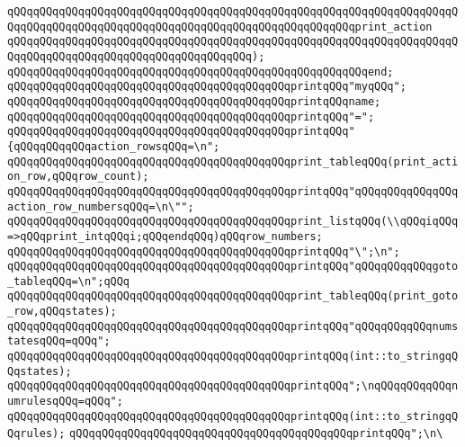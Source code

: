\verb|qQQqqQQqqQQqqQQqqQQqqQQqqQQqqQQqqQQqqQQqqQQqqQQqqQQqqQQqqQQqqQQqqQQqqQQqqQQqqQQqqQQqqQQqqQQqqQQqqQQqqQQqqQQqqQQqqQQqqQQqqQQqprint_action|\newline
\verb|qQQqqQQqqQQqqQQqqQQqqQQqqQQqqQQqqQQqqQQqqQQqqQQqqQQqqQQqqQQqqQQqqQQqqQQqqQQqqQQqqQQqqQQqqQQqqQQqqQQqqQQqqQQq);|\newline
\verb|qQQqqQQqqQQqqQQqqQQqqQQqqQQqqQQqqQQqqQQqqQQqqQQqqQQqqQQqend;|\newline
\newline
\verb|qQQqqQQqqQQqqQQqqQQqqQQqqQQqqQQqqQQqqQQqqQQqprintqQQq"myqQQq";|\newline
\verb|qQQqqQQqqQQqqQQqqQQqqQQqqQQqqQQqqQQqqQQqqQQqprintqQQqname;|\newline
\verb|qQQqqQQqqQQqqQQqqQQqqQQqqQQqqQQqqQQqqQQqqQQqprintqQQq"=";|\newline
\verb|qQQqqQQqqQQqqQQqqQQqqQQqqQQqqQQqqQQqqQQqqQQqprintqQQq"{qQQqqQQqqQQqaction_rowsqQQq=\n";|\newline
\verb|qQQqqQQqqQQqqQQqqQQqqQQqqQQqqQQqqQQqqQQqqQQqprint_tableqQQq(print_action_row,qQQqrow_count);|\newline
\verb|qQQqqQQqqQQqqQQqqQQqqQQqqQQqqQQqqQQqqQQqqQQqprintqQQq"qQQqqQQqqQQqqQQqaction_row_numbersqQQq=\n\"";|\newline
\verb|qQQqqQQqqQQqqQQqqQQqqQQqqQQqqQQqqQQqqQQqqQQqprint_listqQQq(\\qQQqiqQQq=>qQQqprint_intqQQqi;qQQqendqQQq)qQQqrow_numbers;|\newline
\verb|qQQqqQQqqQQqqQQqqQQqqQQqqQQqqQQqqQQqqQQqqQQqprintqQQq"\";\n";|\newline
\verb|qQQqqQQqqQQqqQQqqQQqqQQqqQQqqQQqqQQqqQQqqQQqprintqQQq"qQQqqQQqqQQqgoto_tableqQQq=\n";qQQq|\newline
\verb|qQQqqQQqqQQqqQQqqQQqqQQqqQQqqQQqqQQqqQQqqQQqprint_tableqQQq(print_goto_row,qQQqstates);|\newline
\verb|qQQqqQQqqQQqqQQqqQQqqQQqqQQqqQQqqQQqqQQqqQQqprintqQQq"qQQqqQQqqQQqnumstatesqQQq=qQQq";|\newline
\verb|qQQqqQQqqQQqqQQqqQQqqQQqqQQqqQQqqQQqqQQqqQQqprintqQQq(int::to_stringqQQqstates);|\newline
\verb|qQQqqQQqqQQqqQQqqQQqqQQqqQQqqQQqqQQqqQQqqQQqprintqQQq";\nqQQqqQQqqQQqnumrulesqQQq=qQQq";|\newline
\verb|qQQqqQQqqQQqqQQqqQQqqQQqqQQqqQQqqQQqqQQqqQQqprintqQQq(int::to_stringqQQqrules);|\newline
\verb|qQQqqQQqqQQqqQQqqQQqqQQqqQQqqQQqqQQqqQQqqQQqprintqQQq";\n\|\newline
